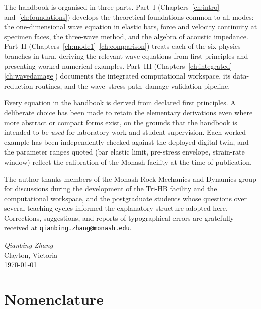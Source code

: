 \documentclass[11pt,a4paper,openany]{book}
\theoremstyle{handbook}
\begin{document}
The handbook is organised in three parts. Part~I (Chapters~\ref{ch:intro}
and~\ref{ch:foundations}) develops the theoretical foundations common to all
modes: the one-dimensional wave equation in elastic bars, force and velocity
continuity at specimen faces, the three-wave method, and the algebra of
acoustic impedance. Part~II (Chapters~\ref{ch:mode1}--\ref{ch:comparison})
treats each of the six physics branches in turn, deriving the relevant wave
equations from first principles and presenting worked numerical examples.
Part~III (Chapters~\ref{ch:integrated}--\ref{ch:wavedamage}) documents the
integrated computational workspace, its data-reduction routines, and the
wave--stress-path--damage validation pipeline.

Every equation in the handbook is derived from declared first principles. A
deliberate choice has been made to retain the elementary derivations even where
more abstract or compact forms exist, on the grounds that the handbook is
intended to be \emph{used} for laboratory work and student supervision. Each
worked example has been independently checked against the deployed digital
twin, and the parameter ranges quoted (bar elastic limit, pre-stress envelope,
strain-rate window) reflect the calibration of the Monash facility at the time
of publication.

The author thanks members of the Monash Rock Mechanics and Dynamics group for
discussions during the development of the Tri-HB facility and the
computational workspace, and the postgraduate students whose questions over
several teaching cycles informed the explanatory structure adopted here.
Corrections, suggestions, and reports of typographical errors are gratefully
received at \texttt{qianbing.zhang@monash.edu}.

\bigskip
\begin{flushright}
\textit{Qianbing Zhang}\\
Clayton, Victoria\\
\today
\end{flushright}

\cleardoublepage
{}
\tableofcontents

\cleardoublepage
\chapter*{Nomenclature}
\end{document}
